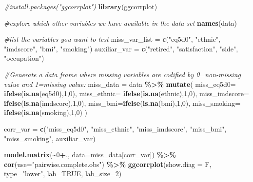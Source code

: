 \documentclass[
]{article}
\newenvironment{Shaded}{\begin{snugshade}}{\end{snugshade}}
\newcommand{\AttributeTok}[1]{\textcolor[rgb]{0.13,0.29,0.53}{#1}}
\newcommand{\CommentTok}[1]{\textcolor[rgb]{0.56,0.35,0.01}{\textit{#1}}}
\newcommand{\ConstantTok}[1]{\textcolor[rgb]{0.56,0.35,0.01}{#1}}
\newcommand{\DecValTok}[1]{\textcolor[rgb]{0.00,0.00,0.81}{#1}}
\newcommand{\FunctionTok}[1]{\textcolor[rgb]{0.13,0.29,0.53}{\textbf{#1}}}
\newcommand{\NormalTok}[1]{#1}
\newcommand{\OtherTok}[1]{\textcolor[rgb]{0.56,0.35,0.01}{#1}}
\newcommand{\SpecialCharTok}[1]{\textcolor[rgb]{0.81,0.36,0.00}{\textbf{#1}}}
\newcommand{\StringTok}[1]{\textcolor[rgb]{0.31,0.60,0.02}{#1}}
\begin{document}
\begin{Shaded}
\begin{Highlighting}[]
\CommentTok{\#install.packages("ggcorrplot")}
\FunctionTok{library}\NormalTok{(ggcorrplot)}

\CommentTok{\#explore which other variables we have available in the data set}
\FunctionTok{names}\NormalTok{(data)}

\CommentTok{\#list the variables you want to test}
\NormalTok{miss\_var\_list }\OtherTok{=} \FunctionTok{c}\NormalTok{(}\StringTok{"eq5d0"}\NormalTok{, }\StringTok{"ethnic"}\NormalTok{, }\StringTok{"imdscore"}\NormalTok{, }\StringTok{"bmi"}\NormalTok{, }\StringTok{"smoking"}\NormalTok{)}
\NormalTok{auxiliar\_var  }\OtherTok{=} \FunctionTok{c}\NormalTok{(}\StringTok{"retired"}\NormalTok{, }\StringTok{"satisfaction"}\NormalTok{, }\StringTok{"side"}\NormalTok{, }\StringTok{"occupation"}\NormalTok{)}

\CommentTok{\#Generate a data frame where missing variables are codified by 0=non{-}missing value and 1=missing value:}
\NormalTok{miss\_data }\OtherTok{=}\NormalTok{  data }\SpecialCharTok{\%\textgreater{}\%} \FunctionTok{mutate}\NormalTok{(}
  \AttributeTok{miss\_eq5d0=} \FunctionTok{ifelse}\NormalTok{(}\FunctionTok{is.na}\NormalTok{(eq5d0),}\DecValTok{1}\NormalTok{,}\DecValTok{0}\NormalTok{), }
  \AttributeTok{miss\_ethnic=} \FunctionTok{ifelse}\NormalTok{(}\FunctionTok{is.na}\NormalTok{(ethnic),}\DecValTok{1}\NormalTok{,}\DecValTok{0}\NormalTok{), }
  \AttributeTok{miss\_imdscore=} \FunctionTok{ifelse}\NormalTok{(}\FunctionTok{is.na}\NormalTok{(imdscore),}\DecValTok{1}\NormalTok{,}\DecValTok{0}\NormalTok{), }
  \AttributeTok{miss\_bmi=}\FunctionTok{ifelse}\NormalTok{(}\FunctionTok{is.na}\NormalTok{(bmi),}\DecValTok{1}\NormalTok{,}\DecValTok{0}\NormalTok{), }
  \AttributeTok{miss\_smoking=} \FunctionTok{ifelse}\NormalTok{(}\FunctionTok{is.na}\NormalTok{(smoking),}\DecValTok{1}\NormalTok{,}\DecValTok{0}\NormalTok{) )}

\NormalTok{corr\_var }\OtherTok{=} \FunctionTok{c}\NormalTok{(}\StringTok{"miss\_eq5d0"}\NormalTok{, }\StringTok{"miss\_ethnic"}\NormalTok{, }\StringTok{"miss\_imdscore"}\NormalTok{, }\StringTok{"miss\_bmi"}\NormalTok{, }\StringTok{"miss\_smoking"}\NormalTok{, auxiliar\_var)}

\FunctionTok{model.matrix}\NormalTok{(}\SpecialCharTok{\textasciitilde{}}\DecValTok{0}\SpecialCharTok{+}\NormalTok{., }\AttributeTok{data=}\NormalTok{miss\_data[corr\_var]) }\SpecialCharTok{\%\textgreater{}\%} 
  \FunctionTok{cor}\NormalTok{(}\AttributeTok{use=}\StringTok{"pairwise.complete.obs"}\NormalTok{)  }\SpecialCharTok{\%\textgreater{}\%} 
  \FunctionTok{ggcorrplot}\NormalTok{(}\AttributeTok{show.diag =}\NormalTok{ F, }\AttributeTok{type=}\StringTok{"lower"}\NormalTok{, }\AttributeTok{lab=}\ConstantTok{TRUE}\NormalTok{, }\AttributeTok{lab\_size=}\DecValTok{2}\NormalTok{)}
\end{Highlighting}
\end{Shaded}
\end{document}
